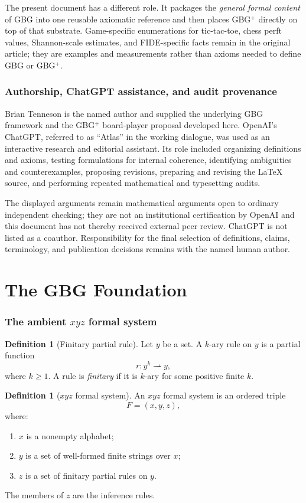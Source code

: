 \documentclass[11pt]{article}
\theoremstyle{definition}
\newtheorem{definition}[theorem]{Definition}
\theoremstyle{remark}
\begin{document}
The present document has a different role.  It packages the \emph{general formal content} of GBG into one reusable axiomatic reference and then places GBG$^{+}$ directly on top of that substrate.  Game-specific enumerations for tic-tac-toe, chess perft values, Shannon-scale estimates, and FIDE-specific facts remain in the original article; they are examples and measurements rather than axioms needed to define GBG or GBG$^{+}$.

\section{Authorship, ChatGPT assistance, and audit provenance}
Brian Tenneson is the named author and supplied the underlying GBG framework and the GBG$^{+}$ board-player proposal developed here.  OpenAI's ChatGPT, referred to as ``Atlas'' in the working dialogue, was used as an interactive research and editorial assistant.  Its role included organizing definitions and axioms, testing formulations for internal coherence, identifying ambiguities and counterexamples, proposing revisions, preparing and revising the LaTeX source, and performing repeated mathematical and typesetting audits.

The displayed arguments remain mathematical arguments open to ordinary independent checking; they are not an institutional certification by OpenAI and this document has not thereby received external peer review.  ChatGPT is not listed as a coauthor.  Responsibility for the final selection of definitions, claims, terminology, and publication decisions remains with the named human author.

\part{The GBG Foundation}

\section{The ambient \texorpdfstring{$xyz$}{xyz} formal system}

\begin{definition}[Finitary partial rule]
Let $y$ be a set.  A $k$-ary rule on $y$ is a partial function
\[
r:y^k\rightharpoonup y,
\]
where $k\ge 1$.  A rule is \emph{finitary} if it is $k$-ary for some positive finite $k$.
\end{definition}

\begin{definition}[$xyz$ formal system]
An $xyz$ formal system is an ordered triple
\[
F=(x,y,z),
\]
where:
\begin{enumerate}[label=(\roman*),leftmargin=1.7em]
\item $x$ is a nonempty alphabet;
\item $y$ is a set of well-formed finite strings over $x$;
\item $z$ is a set of finitary partial rules on $y$.
\end{enumerate}
The members of $z$ are the inference rules.
\end{definition}
\end{document}
